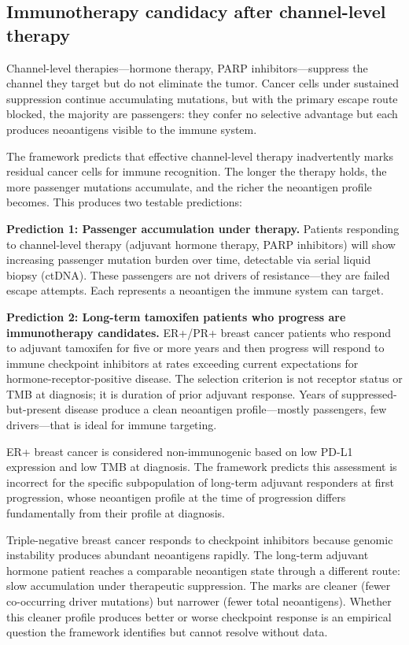 \documentclass[11pt]{article}
\begin{document}
\subsection{Immunotherapy candidacy after channel-level therapy}

Channel-level therapies---hormone therapy, PARP inhibitors---suppress
the channel they target but do not eliminate the tumor. Cancer cells
under sustained suppression continue accumulating mutations, but with
the primary escape route blocked, the majority are passengers: they
confer no selective advantage but each produces neoantigens visible
to the immune system.

The framework predicts that effective channel-level therapy
inadvertently marks residual cancer cells for immune recognition.
The longer the therapy holds, the more passenger mutations
accumulate, and the richer the neoantigen profile becomes. This
produces two testable predictions:

\textbf{Prediction 1: Passenger accumulation under therapy.}
Patients responding to channel-level therapy (adjuvant hormone
therapy, PARP inhibitors) will show increasing passenger mutation
burden over time, detectable via serial liquid biopsy (ctDNA).
These passengers are not drivers of resistance---they are failed
escape attempts. Each represents a neoantigen the immune system
can target.

\textbf{Prediction 2: Long-term tamoxifen patients who progress are
immunotherapy candidates.} ER+/PR+ breast cancer patients who
respond to adjuvant tamoxifen for five or more years and then
progress will respond to immune checkpoint inhibitors at rates
exceeding current expectations for hormone-receptor-positive
disease. The selection criterion is not receptor status or TMB at
diagnosis; it is duration of prior adjuvant response. Years of
suppressed-but-present disease produce a clean neoantigen
profile---mostly passengers, few drivers---that is ideal for
immune targeting.

ER+ breast cancer is considered non-immunogenic based on low PD-L1
expression and low TMB at diagnosis. The framework predicts this
assessment is incorrect for the specific subpopulation of long-term
adjuvant responders at first progression, whose neoantigen profile
at the time of progression differs fundamentally from their profile
at diagnosis.

Triple-negative breast cancer responds to checkpoint inhibitors
because genomic instability produces abundant neoantigens rapidly.
The long-term adjuvant hormone patient reaches a comparable
neoantigen state through a different route: slow accumulation under
therapeutic suppression. The marks are cleaner (fewer co-occurring
driver mutations) but narrower (fewer total neoantigens). Whether
this cleaner profile produces better or worse checkpoint response
is an empirical question the framework identifies but cannot
resolve without data.
\end{document}
